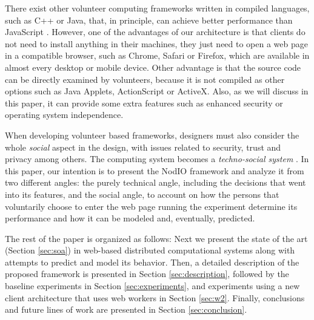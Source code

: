 \documentclass[journal,onecolumn]{IEEEtran}
\begin{document}
There exist other volunteer computing frameworks written in compiled languages,
such as C++ or Java, that, in principle, can achieve better performance than
JavaScript \cite{2015arXiv151101088M}. However, one of the advantages of our architecture is that
clients do not need to install anything in their machines, they just
need to open a web page  
in a compatible browser, such as Chrome, Safari or Firefox, which are
available in almost every desktop or mobile device. Other advantage is
that the source code can be directly examined by volunteers, because it is not
compiled as other options such as Java Applets, ActionScript or
ActiveX.
Also, as we will discuss in this paper, it can provide some extra
features such as enhanced security or operating system independence. 


When developing volunteer based frameworks, designers must
also consider the whole {\em social} aspect in the design, with
issues related to security, trust and privacy among others. 
The computing system becomes a {\em techno-social system} \cite{vespignani2009predicting}.  
In this paper, our intention is to
present the {\sf NodIO} framework and analyze it from two different
angles: the purely technical angle, including the decisions that went
into its features, and the social angle, to account on how the persons
that voluntarily choose to enter the web page running the experiment
determine its performance and how it can be modeled and, eventually,
predicted.

The rest of the paper is organized as follows: Next we present the
state of the art (Section \ref{sec:soa}) in web-based distributed
computational systems along with attempts to predict and model its behavior. 
Then, a detailed description of the proposed framework is presented
in Section \ref{sec:description}, followed by the baseline experiments
in Section \ref{sec:experiments}, and experiments using a new client
architecture that uses web workers in Section \ref{sec:w2}.
Finally, conclusions and future lines of work are presented in Section
\ref{sec:conclusion}. 
\end{document}

